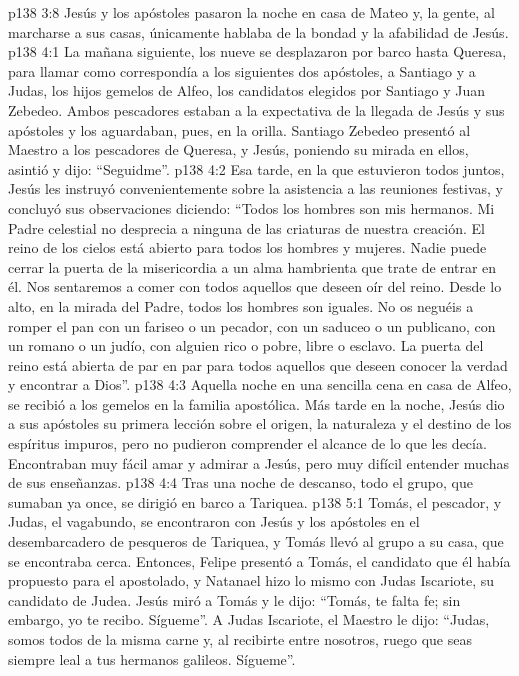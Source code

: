 \vs p138 3:8 Jesús y los apóstoles pasaron la noche en casa de Mateo y, la gente, al marcharse a sus casas, únicamente hablaba de la bondad y la afabilidad de Jesús.
\vs p138 4:1 La mañana siguiente, los nueve se desplazaron por barco hasta Queresa, para llamar como correspondía a los siguientes dos apóstoles, a Santiago y a Judas, los hijos gemelos de Alfeo, los candidatos elegidos por Santiago y Juan Zebedeo. Ambos pescadores estaban a la expectativa de la llegada de Jesús y sus apóstoles y los aguardaban, pues, en la orilla. Santiago Zebedeo presentó al Maestro a los pescadores de Queresa, y Jesús, poniendo su mirada en ellos, asintió y dijo: “Seguidme”.
\vs p138 4:2 \pc Esa tarde, en la que estuvieron todos juntos, Jesús les instruyó convenientemente sobre la asistencia a las reuniones festivas, y concluyó sus observaciones diciendo: “Todos los hombres son mis hermanos. Mi Padre celestial no desprecia a ninguna de las criaturas de nuestra creación. El reino de los cielos está abierto para todos los hombres y mujeres. Nadie puede cerrar la puerta de la misericordia a un alma hambrienta que trate de entrar en él. Nos sentaremos a comer con todos aquellos que deseen oír del reino. Desde lo alto, en la mirada del Padre, todos los hombres son iguales. No os neguéis a romper el pan con un fariseo o un pecador, con un saduceo o un publicano, con un romano o un judío, con alguien rico o pobre, libre o esclavo. La puerta del reino está abierta de par en par para todos aquellos que deseen conocer la verdad y encontrar a Dios”.
\vs p138 4:3 \pc Aquella noche en una sencilla cena en casa de Alfeo, se recibió a los gemelos en la familia apostólica. Más tarde en la noche, Jesús dio a sus apóstoles su primera lección sobre el origen, la naturaleza y el destino de los espíritus impuros, pero no pudieron comprender el alcance de lo que les decía. Encontraban muy fácil amar y admirar a Jesús, pero muy difícil entender muchas de sus enseñanzas.
\vs p138 4:4 Tras una noche de descanso, todo el grupo, que sumaban ya once, se dirigió en barco a Tariquea.
\vs p138 5:1 Tomás, el pescador, y Judas, el vagabundo, se encontraron con Jesús y los apóstoles en el desembarcadero de pesqueros de Tariquea, y Tomás llevó al grupo a su casa, que se encontraba cerca. Entonces, Felipe presentó a Tomás, el candidato que él había propuesto para el apostolado, y Natanael hizo lo mismo con Judas Iscariote, su candidato de Judea. Jesús miró a Tomás y le dijo: “Tomás, te falta fe; sin embargo, yo te recibo. Sígueme”. A Judas Iscariote, el Maestro le dijo: “Judas, somos todos de la misma carne y, al recibirte entre nosotros, ruego que seas siempre leal a tus hermanos galileos. Sígueme”.
